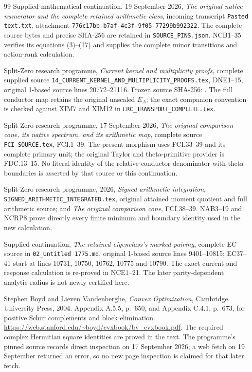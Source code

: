 \documentclass[11pt,a4paper]{article}
\begin{document}
\begin{thebibliography}{99}
Supplied mathematical continuation, 19 September 2026,
\emph{The original native numerator and the complete retained arithmetic class},
incoming transcript \texttt{Pasted text.txt}, attachment
\texttt{776c17bb-b7af-4c3f-9f05-77299b992322}.
The complete source bytes and precise SHA-256 are retained in
\texttt{SOURCE\_PINS.json}. NCB1--35 verifies its equations (3)--(17)
and supplies the complete minor transitions and action-rank calculation.

Split-Zero research programme, \emph{Current kernel and multiplicity proofs},
complete supplied source \texttt{14\_CURRENT\_KERNEL\_AND\_MULTIPLICITY\_PROOFS.tex},
DNE1--15, original 1-based source lines 20772--21116.
Frozen source SHA-256:
.
The full conductor map retains the original unscaled $E_A$;
the exact companion convention is checked against XIM7 and XIM12
in \texttt{LRC\_TRANSPORT\_COMPLETE.tex}.

Split-Zero research programme, 17 September 2026,
\emph{The original comparison cone, its native spectrum, and its arithmetic map},
complete source \texttt{FCI\_SOURCE.tex}, FCI.1--39.
The present morphism uses FCI.33--39 and its complete primary unit;
the original Taylor and theta-primitive provider is FDC.13--15.
No literal identity of the relative conductor denominator with theta
boundaries is asserted by that source or this continuation.

Split-Zero research programme, 2026,
\emph{Signed arithmetic integration},
\texttt{SIGNED\_ARITHMETIC\_INTEGRATED.tex}, original attained
moment quotient and full arithmetic source;
and \emph{The original comparison cone}, FCI.38--39.
NAB3--19 and NCRP8 prove directly every finite minimum and boundary
identity used in the new calculation.

Supplied continuation, \emph{The retained eigenclass's marked pairing},
complete EC source in \texttt{02\_Untitled 1775.md},
original 1-based source lines 9401--10815;
EC37--41 start at lines 10731, 10750, 10762, 10775 and 10790.
The exact current and response calculation is re-proved in NCE1--21.
The later parity-dependent analytic radius is not newly certified here.

Stephen Boyd and Lieven Vandenberghe,
\emph{Convex Optimization}, Cambridge University Press, 2004.
Appendix A.5.5, p.~650, and Appendix C.4.1, p.~673,
for positive Schur complements and block elimination.
\url{https://web.stanford.edu/~boyd/cvxbook/bv_cvxbook.pdf}.
The required complex Hermitian square identities are proved in the text.
The programme's pinned source records direct inspection on
17 September 2026; a web fetch on 19 September returned an error,
so no new page inspection is claimed for that later fetch.


\end{thebibliography}
\end{document}
